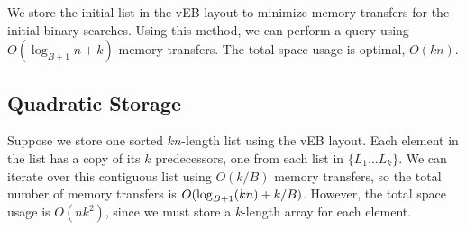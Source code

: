We store the initial list in the vEB layout to minimize memory transfers for the 
initial binary searches. Using this method, we can perform a query using 
$O(\log_{B+1} n + k)$ memory transfers. The total space usage is optimal, $O(kn)$.

\subsection*{Quadratic Storage}
Suppose we store one sorted $kn$-length list using the vEB layout. Each element in the list has 
a copy of its $k$ predecessors, one from each list in $\{ L_1 \ldots L_k \}$. 
We can iterate over this contiguous list using $O(k/B)$ memory transfers, 
so the total number of memory transfers is $O(\log_{B+1} \mathopen{}\left(kn\right)\mathclose{} + k/B)$. However, the
total space usage is $O(nk^2)$, since we must store a $k$-length array for each element.



